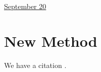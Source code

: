 \documentclass[11pt,letterpaper]{article}
\begin{document}
\href{run:2025-09-20-newmethod.tex}{\Huge September 20} %

\section{New Method}

We have a citation \cite{research_methods2024}.

 
\end{document}
